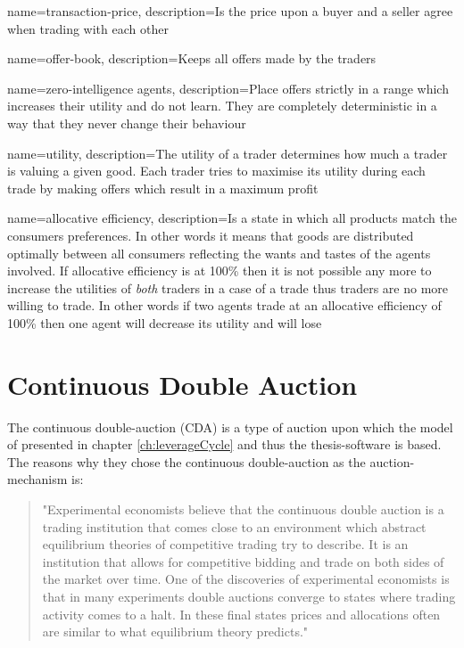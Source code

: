 \documentclass[../Bachelorarbeit.tex]{subfiles}
\begin{document}
 {
	name=transaction-price,
	description={Is the price upon a buyer and a seller agree when trading with each other}
}

 {
	name=offer-book,
	description={Keeps all offers made by the traders}
}

 {
	name=zero-intelligence agents,
	description={Place offers strictly in a range which increases their utility and do not learn. They are completely deterministic in a way that they never change their behaviour}
}

 {
	name=utility,
	description={The utility of a trader determines how much a trader is valuing a given good. Each trader tries to maximise its utility during each trade by making offers which result in a maximum profit}
}

 {
	name=allocative efficiency,
	description={Is a state in which all products match the consumers preferences. In other words it means that goods are distributed optimally between all consumers reflecting the wants and tastes of the agents involved. If allocative efficiency is at 100\% then it is not possible any more to increase the utilities of \textit{both} traders in a case of a trade thus traders are no more willing to trade. In other words if two agents trade at an allocative efficiency of 100\% then one agent will decrease its utility and will lose}
}

\section{Continuous Double Auction}	
The continuous double-auction (CDA) is a type of auction upon which the model of \cite{Breuer2015} presented in chapter \ref{ch:leverageCycle} and thus the thesis-software is based. The reasons why they chose the continuous double-auction as the auction-mechanism is:

\begin{quote}
"Experimental economists believe that the continuous double auction is a trading institution that comes close to an environment which abstract equilibrium theories of competitive trading try to describe. It is an institution that allows for competitive bidding and trade on both sides of the market over time. One of the discoveries of experimental economists is that in many experiments double auctions converge to states where trading activity comes to a halt. In these final states prices and allocations often are similar to what equilibrium theory predicts." \cite{Breuer2015}
\end{quote}
\end{document}
